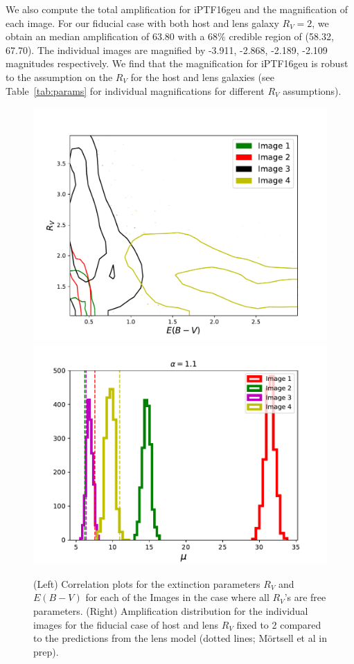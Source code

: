 \documentclass[a4paper,fleqn,usenatbib]{mnras}
\begin{document}
We also compute the total amplification for iPTF16geu and the magnification of each image. For our fiducial case with both host and lens galaxy $R_V = 2$, we obtain an median amplification of 63.80 with a 68$\%$ credible region of (58.32, 67.70). The individual images are magnified by -3.911, -2.868, -2.189, -2.109 magnitudes respectively. We find that the magnification for iPTF16geu is robust to the assumption on the $R_V$ for the host and lens galaxies (see Table~\ref{tab:params} for individual magnifications for different $R_V$ assumptions).








\begin{figure}
    \centering
    \includegraphics[width=.48\textwidth]{RV_EBV_lens_16geu.pdf}
    \includegraphics[width=.48\textwidth]{amplitude_RVto2_JoelPhoto_ModelCompAlpha11.pdf}
    \caption{(Left) Correlation plots for the extinction parameters $R_V$ and $E(B-V)$ for each of the Images in the case where all $R_V$'s are free parameters. (Right) Amplification distribution for the individual images for the fiducial case of host and lens $R_V$ fixed to 2 compared to the predictions from the lens model (dotted lines; M{\"o}rtsell et al in prep).}
    \label{fig:corner_Image4}
\end{figure}
\end{document}
